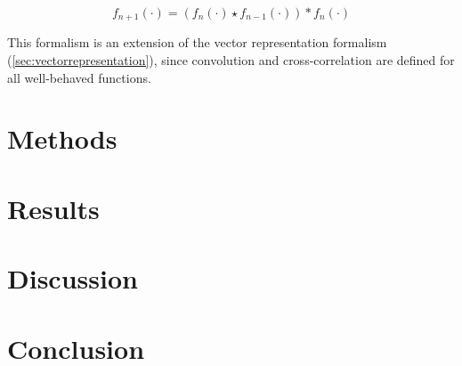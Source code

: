 \documentclass{article}
\begin{document}
\begin{equation}
  f_{n+1}(\cdot) = (f_n(\cdot) \star f_{n-1}(\cdot)) * f_n(\cdot)
\end{equation}

This formalism is an extension of the vector representation formalism (\ref{sec:vectorrepresentation}),
since convolution and cross-correlation are defined for all well-behaved functions.

\section{Methods}

\section{Results}

\section{Discussion}

\section{Conclusion}
\end{document}
